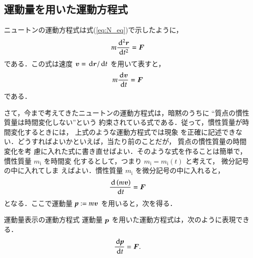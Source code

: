         \subsection{運動量を用いた運動方程式}\label{運動量_運動方程式}
                ニュートンの運動方程式は式(\ref{eq:N_eq})で示したように，
                    \begin{align}
                        m\frac{\,\mathrm{d}^{2}\boldsymbol{r}}{\,\mathrm{d} t^{2}} = \boldsymbol{F}
                    \end{align}
                である．この式は速度 $\boldsymbol{v}=\,\mathrm{d}\boldsymbol{r}/\,\mathrm{d} t$ を用いて表すと，
                    \begin{align}\label{eq:N_peq}
                        m\frac{\df\bv}{\df t} = \bF
                    \end{align}
                である．

                さて，今まで考えてきたニュートンの運動方程式は，暗黙のうちに
                “質点の慣性質量は時間変化しない”という
                約束されている式である．従って，慣性質量が時間変化するときには，
                上式のような運動方程式では現象
                を正確に記述できない．どうすればよいかといえば，当たり前のことだが，
                質点の慣性質量の時間変化を考
                慮に入れた式に書き直せばよい．そのような式を作ることは簡単で，
                慣性質量 $m_{\mathrm{i}}$ を時間変
                化するとして，つまり $m_{\mathrm{i}}=m_{\mathrm{i}} (t)$ と考えて，
                微分記号の中に入れてしま
                えばよい．慣性質量 $m_{\mathrm{i}}$ を微分記号の中に入れると，
                    \begin{align}
                        \frac{\,\mathrm{d} \left( m\boldsymbol{v}\right)}{\,\mathrm{d} t} = \boldsymbol{F}
                    \end{align}
                となる．ここで運動量 $\textit{\textbf{p}} := m \boldsymbol{v}$ を用いると，次を得る．
                        \begin{myshadebox}{運動量表示の運動方程式}
                            運動量 $\boldsymbol{p}$ を用いた運動方程式は，次のように表現できる．
                            \begin{align}\label{6}
                                \frac{\df\textit{\textbf{p}}}{\df t} = \bF.
                            \end{align}
                        \end{myshadebox}

